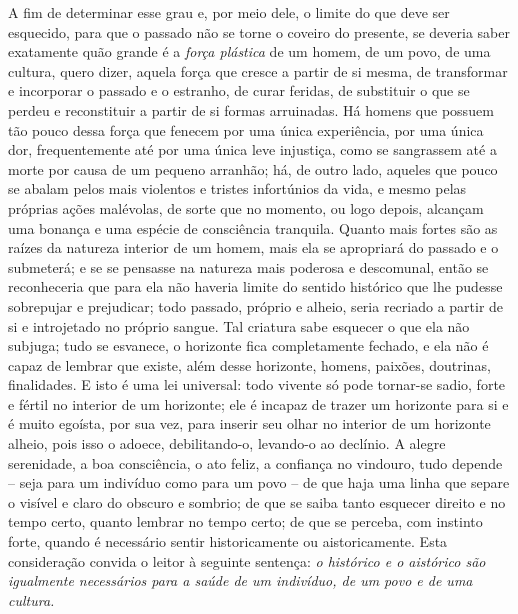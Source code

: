 A fim de determinar esse grau e, por meio dele, o limite do que
deve ser esquecido, para que o passado não se torne o coveiro do
presente, se deveria saber exatamente quão grande é a \emph{força
plástica} de um homem, de um povo, de uma cultura, quero dizer, aquela
força que cresce a partir de si mesma, de transformar e incorporar o
passado e o estranho, de curar feridas, de substituir o que se perdeu e
reconstituir a partir de si formas arruinadas. Há homens que possuem tão
pouco dessa força que fenecem por uma única experiência, por uma única
dor, frequentemente até por uma única leve injustiça, como se sangrassem
até a morte por causa de um pequeno arranhão; há, de outro lado, aqueles
que pouco se abalam pelos mais violentos e tristes infortúnios da vida,
e mesmo pelas próprias ações malévolas, de sorte que no momento, ou logo
depois, alcançam uma bonança e uma espécie de consciência tranquila.
Quanto mais fortes são as raízes da natureza interior de um homem, mais
ela se apropriará do passado e o submeterá; e se se pensasse na natureza
mais poderosa e descomunal, então se reconheceria que para ela não
haveria limite do sentido histórico que lhe pudesse sobrepujar e
prejudicar; todo passado, próprio e alheio, seria recriado a partir de
si e introjetado no próprio sangue. Tal criatura sabe esquecer o que ela
não subjuga; tudo se esvanece, o horizonte fica completamente fechado, e
ela não é capaz de lembrar que existe, além desse horizonte, homens,
paixões, doutrinas, finalidades. E isto é uma lei universal: todo
vivente só pode tornar-se sadio, forte e fértil no interior de um
horizonte; ele é incapaz de trazer um horizonte para si e é muito
egoísta, por sua vez, para inserir seu olhar no interior de um horizonte
alheio, pois isso o adoece, debilitando-o, levando-o ao declínio. A
alegre serenidade, a boa consciência, o ato feliz, a confiança no
vindouro, tudo depende -- seja para um indivíduo como para um povo -- de
que haja uma linha que separe o visível e claro do obscuro e sombrio; de
que se saiba tanto esquecer direito e no tempo certo, quanto lembrar no
tempo certo; de que se perceba, com instinto forte, quando é necessário
sentir historicamente ou aistoricamente. Esta consideração convida o
leitor à seguinte sentença: \emph{o histórico e o aistórico são
igualmente necessários para a saúde de um indivíduo, de um povo e de uma
cultura.}

